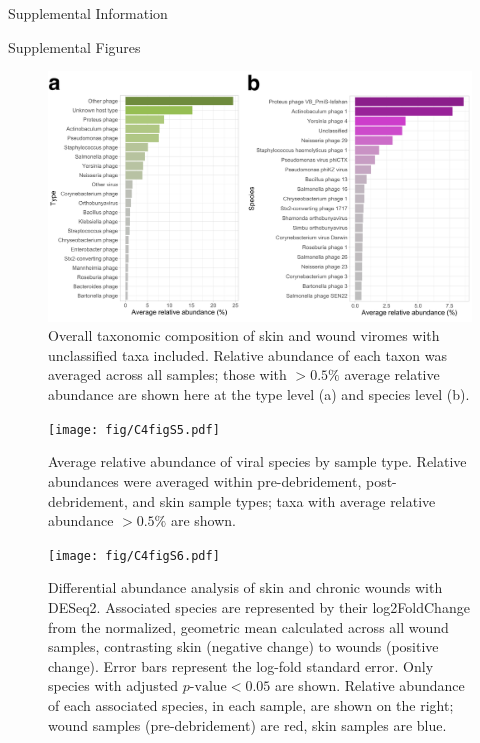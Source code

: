 \documentclass[oneside,12pt,final]{sty/ucthesis-CA2012}
\begin{document}
\begin{mainmatter}
\begin{section}{Supplemental Information}
\begin{subsection}{Supplemental Figures}
\begin{figure}[h]
\centering
\centerline{\includegraphics[width=\textwidth]{fig/C4figS4.pdf}}
\caption{Overall taxonomic composition of skin and wound viromes with unclassified taxa included. Relative abundance of each taxon was averaged across all samples; those with $>0.5\%$ average relative abundance are shown here at the type level (a) and species level (b).}
\label{fig:C4S4}
\end{figure}

\begin{figure}[h]
\centering
\centerline{\texttt{[image: fig/C4figS5.pdf]}}
\caption{Average relative abundance of viral species by sample type. Relative abundances were averaged within pre-debridement, post-debridement, and skin sample types; taxa with average relative abundance $>0.5\%$ are shown.}
\label{fig:C4S5}
\end{figure}

\begin{figure}[h]
\centering
\centerline{\texttt{[image: fig/C4figS6.pdf]}}
\caption{Differential abundance analysis of skin and chronic wounds with DESeq2. Associated species are represented by their log2FoldChange from the normalized, geometric mean calculated across all wound samples, contrasting skin (negative change) to wounds (positive change). Error bars represent the log-fold standard error. Only species with adjusted $p\text{-value}<0.05$ are shown. Relative abundance of each associated species, in each sample, are shown on the right; wound samples (pre-debridement) are red, skin samples are blue.}
\label{fig:C4S6}
\end{figure}


\end{subsection}
\end{section}
\end{mainmatter}
\end{document}
